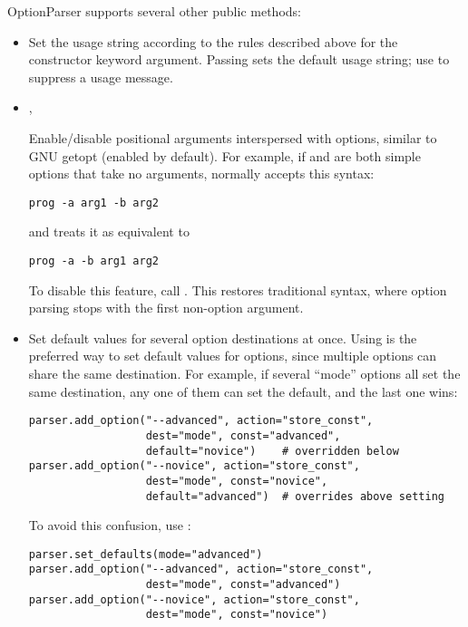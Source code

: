 OptionParser supports several other public methods:
\begin{itemize}
\item {} 

Set the usage string according to the rules described above for the
 constructor keyword argument.  Passing  sets the
default usage string; use  to suppress a usage
message.

\item {} 
, 

Enable/disable positional arguments interspersed with options, similar
to GNU getopt (enabled by default).  For example, if  and
 are both simple options that take no arguments, 
normally accepts this syntax:
\begin{verbatim}
prog -a arg1 -b arg2
\end{verbatim}

and treats it as equivalent to
\begin{verbatim}
prog -a -b arg1 arg2
\end{verbatim}

To disable this feature, call .  This
restores traditional \UNIX{} syntax, where option parsing stops with the
first non-option argument.

\item {} 

Set default values for several option destinations at once.  Using
 is the preferred way to set default values for
options, since multiple options can share the same destination.  For
example, if several ``mode'' options all set the same destination, any
one of them can set the default, and the last one wins:
\begin{verbatim}
parser.add_option("--advanced", action="store_const",
                  dest="mode", const="advanced",
                  default="novice")    # overridden below
parser.add_option("--novice", action="store_const",
                  dest="mode", const="novice",
                  default="advanced")  # overrides above setting
\end{verbatim}

To avoid this confusion, use :
\begin{verbatim}
parser.set_defaults(mode="advanced")
parser.add_option("--advanced", action="store_const",
                  dest="mode", const="advanced")
parser.add_option("--novice", action="store_const",
                  dest="mode", const="novice")
\end{verbatim}

\end{itemize}


